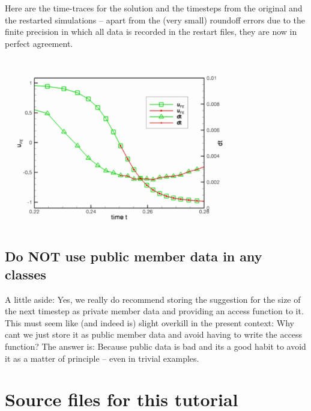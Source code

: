 Here are the time-\/traces for the solution and the timesteps from the original and the restarted simulations -- apart from the (very small) roundoff errors due to the finite precision in which all data is recorded in the restart files, they are now in perfect agreement.

 
\begin{DoxyImage}
\includegraphics[width=0.75\textwidth]{restart_trace}
\end{DoxyImage}




\hypertarget{index_no_pub}{}\subsection{Do N\+O\+T use public member data in any classes}\label{index_no_pub}
A little aside\+: Yes, we really do recommend storing the suggestion for the size of the next timestep as private member data and providing an access function to it. This must seem like (and indeed is) slight overkill in the present context\+: Why can\textquotesingle{}t we just store it as public member data and avoid having to write the access function? The answer is\+: Because public data is bad and it\textquotesingle{}s a good habit to avoid it as a matter of principle -- even in trivial examples.



 

\hypertarget{index_sources}{}\section{Source files for this tutorial}\label{index_sources}

